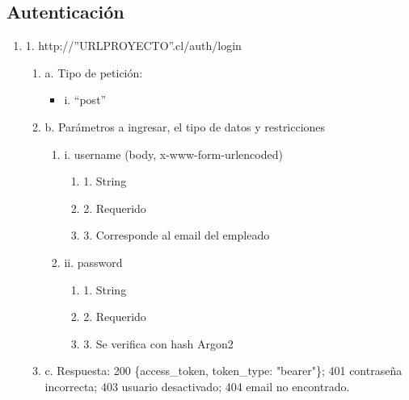 
\subsection{Autenticación}

\begin{enumerate}
    \item 1. http://”URLPROYECTO”.cl/auth/login
    \begin{enumerate}
        \item a. Tipo de petición:
            \begin{itemize}
               \item i. “post”
            \end{itemize}
        \item b. Parámetros a ingresar, el tipo de datos y restricciones
            \begin{enumerate}
                \item i. username (body, x-www-form-urlencoded)
                    \begin{enumerate}
                        \item 1. String
                        \item 2. Requerido
                        \item 3. Corresponde al email del empleado
                    \end{enumerate}
                \item ii. password
                    \begin{enumerate}
                        \item 1. String
                        \item 2. Requerido
                        \item 3. Se verifica con hash Argon2
                    \end{enumerate}
            \end{enumerate}
        \item c. Respuesta: 200 \{access\_token, token\_type: "bearer"\}; 401 contraseña incorrecta; 403 usuario desactivado; 404 email no encontrado.
    \end{enumerate}
\end{enumerate}


